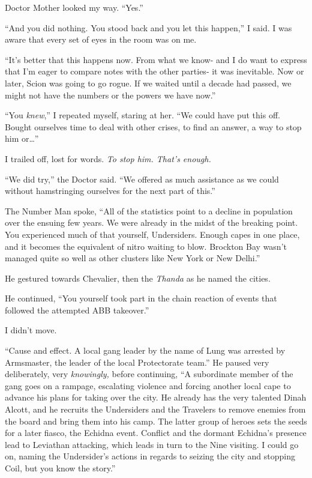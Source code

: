 Doctor Mother looked my way.  ``Yes.''



``And you did nothing.  You stood back and you let this happen,'' I said.  I was aware that every set of eyes in the room was on me.



``It's better that this happens now.  From what we know- and I do want to express that I'm eager to compare notes with the other parties- it was inevitable.  Now or later, Scion was going to go rogue.  If we waited until a decade had passed, we might not have the numbers or the powers we have now.''



``You \emph{knew},'' I repeated myself, staring at her.  ``We could have put this off.  Bought ourselves time to deal with other crises, to find an answer, a way to stop him or\ldots''



I trailed off, lost for words.  \emph{To stop him.  That's enough.}



``We did try,'' the Doctor said.  ``We offered as much assistance as we could without hamstringing ourselves for the next part of this.''



The Number Man spoke, ``All of the statistics point to a decline in population over the ensuing few years.  We were already in the midst of the breaking point. You experienced much of that yourself, Undersiders.  Enough capes in one place, and it becomes the equivalent of nitro waiting to blow.  Brockton Bay wasn't managed quite so well as other clusters like New York or New Delhi.''



He gestured towards Chevalier, then the \emph{Thanda} as he named the cities.



He continued, ``You yourself took part in the chain reaction of events that followed the attempted ABB takeover.''



I didn't move.



``Cause and effect.  A local gang leader by the name of Lung was arrested by Armsmaster, the leader of the local Protectorate team.''  He paused very deliberately, very \emph{knowingly, }before continuing, ``A subordinate member of the gang goes on a rampage, escalating violence and forcing another local cape to advance his plans for taking over the city.  He already has the very talented Dinah Alcott, and he recruits the Undersiders and the Travelers to remove enemies from the board and bring them into his camp.  The latter group of heroes sets the seeds for a later fiasco, the Echidna event.  Conflict and the dormant Echidna's presence lead to Leviathan attacking, which leads in turn to the Nine visiting.  I could go on, naming the Undersider's actions in regards to seizing the city and stopping Coil, but you know the story.''



